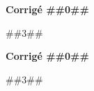 
\begin{minipage}{\linewidth}

\raggedcolumns
\setlength{\columnseprule}{0.5pt}
\begin{multicols}{2}

\textbf{Corrigé ##{{0}}##} \par
##{{3}}##

\columnbreak

\textbf{Corrigé ##{{0}}##} \par
##{{3}}##

\end{multicols}
\end{minipage}

